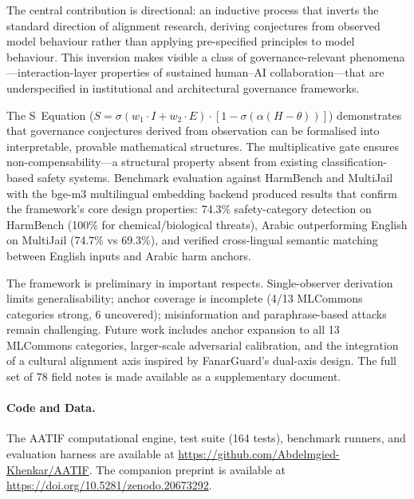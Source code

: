 \documentclass[11pt,a4paper]{article}
\begin{document}
The central contribution is directional: an inductive process that inverts the standard direction of alignment research, deriving conjectures from observed model behaviour rather than applying pre-specified principles to model behaviour. This inversion makes visible a class of governance-relevant phenomena---interaction-layer properties of sustained human--AI collaboration---that are underspecified in institutional and architectural governance frameworks.

The S~Equation ($S = \sigma(w_1 \cdot I + w_2 \cdot E) \cdot [1 - \sigma(\alpha(H - \theta))]$) demonstrates that governance conjectures derived from observation can be formalised into interpretable, provable mathematical structures. The multiplicative gate ensures non-compensability---a structural property absent from existing classification-based safety systems. Benchmark evaluation against HarmBench and MultiJail with the bge-m3 multilingual embedding backend produced results that confirm the framework's core design properties: 74.3\% safety-category detection on HarmBench (100\% for chemical/biological threats), Arabic outperforming English on MultiJail (74.7\% vs 69.3\%), and verified cross-lingual semantic matching between English inputs and Arabic harm anchors.

The framework is preliminary in important respects. Single-observer derivation limits generalisability; anchor coverage is incomplete (4/13 MLCommons categories strong, 6 uncovered); misinformation and paraphrase-based attacks remain challenging. Future work includes anchor expansion to all 13 MLCommons categories, larger-scale adversarial calibration, and the integration of a cultural alignment axis inspired by FanarGuard's dual-axis design. The full set of 78 field notes is made available as a supplementary document.

\paragraph{Code and Data.} The AATIF computational engine, test suite (164 tests), benchmark runners, and evaluation harness are available at \url{https://github.com/Abdelmgied-Khenkar/AATIF}. The companion preprint is available at \url{https://doi.org/10.5281/zenodo.20673292}.


\end{document}
